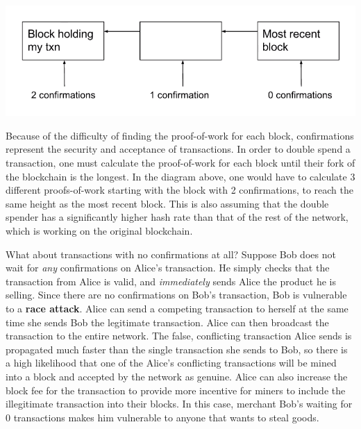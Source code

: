 \documentclass[full.tex]{subfiles}
\begin{document}
  \includegraphics[scale=0.5]{confirmations}
  
  Because of the difficulty of finding the proof-of-work for each block, confirmations represent the security and acceptance of transactions. In order to double spend a transaction, one must calculate the proof-of-work for each block until their fork of the blockchain is the longest. In the diagram above, one would have to calculate 3 different proofs-of-work starting with the block with 2 confirmations, to reach the same height as the most recent block. This is also assuming that the double spender has a significantly higher hash rate than that of the rest of the network, which is working on the original blockchain.
  
  What about transactions with no confirmations at all? Suppose Bob does not wait for \textit{any} confirmations on Alice's transaction. He simply checks that the transaction from Alice is valid, and \textit{immediately} sends Alice the product he is selling. Since there are no confirmations on Bob's transaction, Bob is vulnerable to a \textbf{race attack}. Alice can send a competing transaction to herself at the same time she sends Bob the legitimate transaction. Alice can then broadcast the transaction to the entire network. The false, conflicting transaction Alice sends is propagated much faster than the single transaction she sends to Bob, so there is a high likelihood that one of the Alice's conflicting transactions will be mined into a block and accepted by the network as genuine. Alice can also increase the block fee for the transaction to provide more incentive for miners to include the illegitimate transaction into their blocks. In this case, merchant Bob's waiting for 0 transactions makes him vulnerable to anyone that wants to steal goods. 
  
\end{document}
